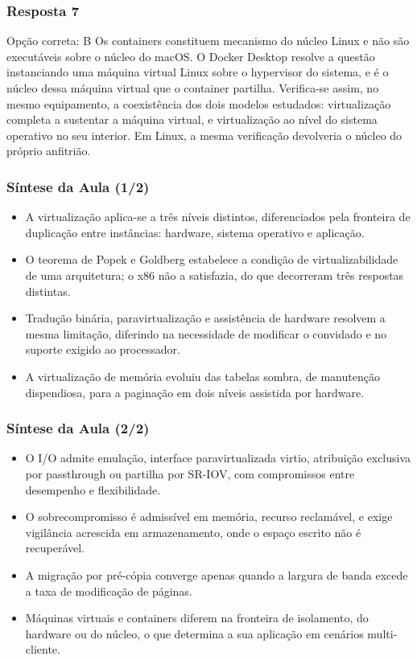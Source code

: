 \documentclass[aspectratio=169]{beamer}
\begin{document}
\begin{frame}
\frametitle{Resposta 7}
\begin{resposta}{Opção correta: B}
Os containers constituem mecanismo do núcleo Linux e não são executáveis sobre o núcleo do macOS. O Docker Desktop resolve a questão instanciando uma máquina virtual Linux sobre o hypervisor do sistema, e é o núcleo dessa máquina virtual que o container partilha. Verifica-se assim, no mesmo equipamento, a coexistência dos dois modelos estudados: virtualização completa a sustentar a máquina virtual, e virtualização ao nível do sistema operativo no seu interior. Em Linux, a mesma verificação devolveria o núcleo do próprio anfitrião.
\end{resposta}
\end{frame}

\begin{frame}
\frametitle{Síntese da Aula \textcolor{NudeTaupe}{\small(1/2)}}
\begin{itemize}
    \setlength\itemsep{0.3cm}
    \item A virtualização aplica-se a três níveis distintos, diferenciados pela fronteira de duplicação entre instâncias: hardware, sistema operativo e aplicação.
    \item O teorema de Popek e Goldberg estabelece a condição de virtualizabilidade de uma arquitetura; o x86 não a satisfazia, do que decorreram três respostas distintas.
    \item Tradução binária, paravirtualização e assistência de hardware resolvem a mesma limitação, diferindo na necessidade de modificar o convidado e no suporte exigido ao processador.
    \item A virtualização de memória evoluiu das tabelas sombra, de manutenção dispendiosa, para a paginação em dois níveis assistida por hardware.
\end{itemize}
\end{frame}

\begin{frame}
\frametitle{Síntese da Aula \textcolor{NudeTaupe}{\small(2/2)}}
\begin{itemize}
    \setlength\itemsep{0.3cm}
    \item O I/O admite emulação, interface paravirtualizada virtio, atribuição exclusiva por passthrough ou partilha por SR-IOV, com compromissos entre desempenho e flexibilidade.
    \item O sobrecompromisso é admissível em memória, recurso reclamável, e exige vigilância acrescida em armazenamento, onde o espaço escrito não é recuperável.
    \item A migração por pré-cópia converge apenas quando a largura de banda excede a taxa de modificação de páginas.
    \item Máquinas virtuais e containers diferem na fronteira de isolamento, do hardware ou do núcleo, o que determina a sua aplicação em cenários multi-cliente.
\end{itemize}
\end{frame}
\end{document}
